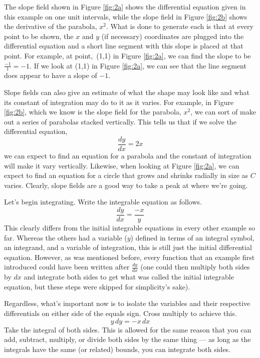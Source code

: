 \documentclass{article}
\newcounter{example}%
\begin{document}
The slope field shown in Figure \ref{fig:2a} shows the differential equation given in this example on one unit intervals, while the slope field in Figure \ref{fig:2b} shows the derivative of the parabola, $x^2$. What is done to generate each is that at every point to be shown, the $x$ and $y$ (if necessary) coordinates are plugged into the differential equation and a short line segment with this slope is placed at that point. For example, at point,\ (1,1) in Figure \ref{fig:2a}, we can find the slope to be $\tfrac{-1}{1}=-1$. If we look at (1,1) in Figure \ref{fig:2a}, we can see that the line segment does appear to have a slope of $-1$.\par
Slope fields can also give an estimate of what the shape may look like and what its constant of integration may do to it as it varies. For example, in Figure \ref{fig:2b}, which we know is the slope field for the parabola, $x^2$, we can sort of make out a series of parabolas stacked vertically. This tells us that if we solve the differential equation,$$\frac{dy}{dx}=2x$$we can expect to find an equation for a parabola and the constant of integration will make it vary vertically. Likewise, when looking at Figure \ref{fig:2a}, we can expect to find an equation for a circle that grows and shrinks radially in size as $C$ varies. Clearly, slope fields are a good way to take a peak at where we're going.\par
Let's begin integrating. Write the integrable equation as follows.
\begin{equation*}
    \frac{dy}{dx}=\frac{-x}{y}
\end{equation*}
This clearly differs from the initial integrable equations in every other example so far. Whereas the others had a variable ($y$) defined in terms of an integral symbol, an integrand, and a variable of integration, this is still just the initial differential equation. However, as was mentioned before, every function that an example first introduced could have been written after $\tfrac{dy}{dx}$ (one could then multiply both sides by $dx$ and integrate both sides to get what was called the initial integrable equation, but these steps were skipped for simplicity's sake).\par
Regardless, what's important now is to isolate the variables and their respective differentials on either side of the equals sign. Cross multiply to achieve this.
\begin{equation*}
    y\, dy=-x\, dx
\end{equation*}
Take the integral of both sides. This is allowed for the same reason that you can add, subtract, multiply, or divide both sides by the same thing --- as long as the integrals have the same (or related) bounds, you can integrate both sides.
\end{document}
